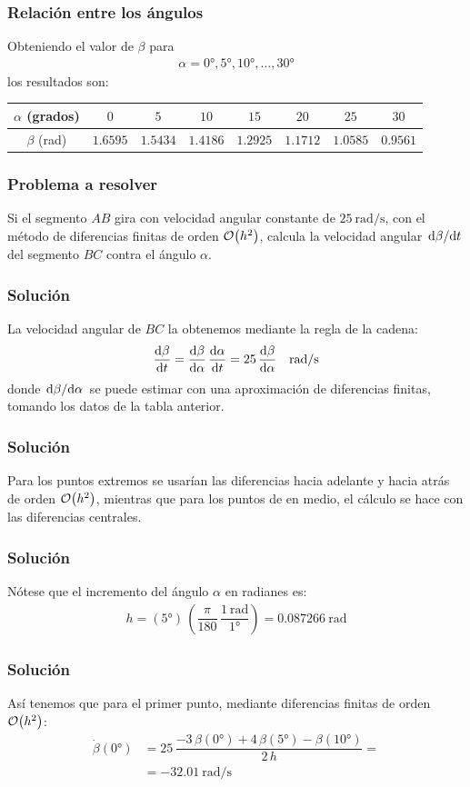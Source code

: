\begin{frame}
\frametitle{Relación entre los ángulos}
Obteniendo el valor de $\beta$ para
\begin{align*}
\alpha=\ang{0}, \ang{5}, \ang{10},\ldots, \ang{30}
\end{align*}
\pause
los resultados son:
\begin{center}
\fontsize{10}{10}\selectfont
\hspace*{-0.5cm}
\begin{tabular}{c | c | c | c | c | c | c | c}
$\alpha$ (grados) & $0$ & $5$ & $10$ & $15$ & $20$ & $25$ & $30$  \\ \hline
$\beta$ (rad) & $1.6595$ & $1.5434$ & $1.4186$ & $1.2925$ & $1.1712$ & $1.0585$ & $0.9561$
\end{tabular}
\end{center}
\end{frame}
\begin{frame}
\frametitle{Problema a resolver}
Si el segmento $AB$ gira con velocidad angular constante de $\SI{25}{\radian\per\second}$, con el método de diferencias finitas de orden $\order{h^{2}}$, calcula la velocidad angular $\dv*{\beta}{t}$ del segmento $BC$ contra el ángulo $\alpha$.
\end{frame}
\begin{frame}
\frametitle{Solución}
La velocidad angular de $BC$ la obtenemos mediante la regla de la cadena:
\begin{align*}
\dv{\beta}{t} = \dv{\beta}{\alpha} \, \dv{\alpha}{t} = 25 \, \dv{\beta}{\alpha} \quad \si{\radian / \second}
\end{align*}
donde $\dv*{\beta}{\alpha}$ se puede estimar con una aproximación de diferencias finitas, tomando los datos de la tabla anterior.
\end{frame}
\begin{frame}
\frametitle{Solución}
Para los puntos extremos se usarían las diferencias hacia adelante y hacia atrás de orden $\order{h^{2}}$, mientras que para los puntos de en medio, el cálculo se hace con las diferencias centrales.
\end{frame}
\begin{frame}
\frametitle{Solución}
Nótese que el incremento del ángulo $\alpha$ en radianes es:
\begin{align*}
h = (\ang{5}) \, \left( \dfrac{\pi}{180} \, \dfrac{\SI{1}{\radian}}{\ang{1}} \right) = \SI{0.087266}{\radian}
\end{align*}
\end{frame}
\begin{frame}
\frametitle{Solución}
Así tenemos que para el primer punto, mediante diferencias finitas de orden $\order{h^{2}}$:
\begin{align*}
\dot{\beta}(\ang{0}) &= 25 \, \dfrac{-3 \, \beta(\ang{0}) + 4 \, \beta(\ang{5}) - \beta(\ang{10})}{2 \, h} = \\
&=  \SI{-32.01}{\radian / \second}
\end{align*}
\end{frame}
